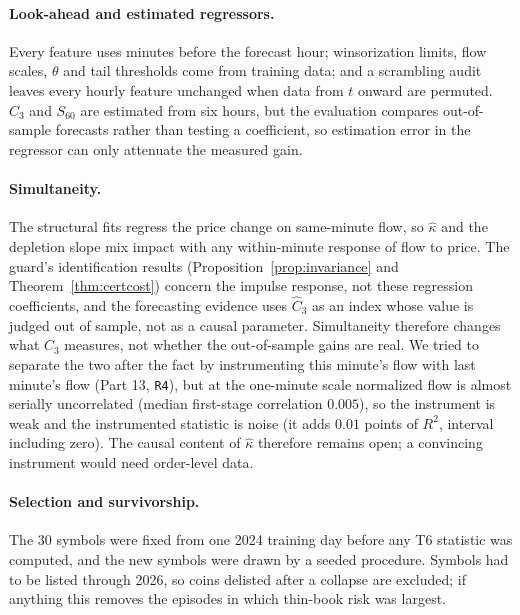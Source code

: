 \paragraph{Look-ahead and estimated regressors.} Every feature uses minutes before the forecast hour; winsorization limits, flow scales, $\theta$ and tail thresholds come from training data; and a scrambling audit leaves every hourly feature unchanged when data from $t$ onward are permuted. $\hat C_3$ and $S_{60}$ are estimated from six hours, but the evaluation compares out-of-sample forecasts rather than testing a coefficient, so estimation error in the regressor can only attenuate the measured gain.

\paragraph{Simultaneity.} The structural fits regress the price change on same-minute flow, so $\hat\kappa$ and the depletion slope mix impact with any within-minute response of flow to price. The guard's identification results (Proposition~\ref{prop:invariance} and Theorem~\ref{thm:certcost}) concern the impulse response, not these regression coefficients, and the forecasting evidence uses $\hat C_3$ as an index whose value is judged out of sample, not as a causal parameter. Simultaneity therefore changes what $\hat C_3$ measures, not whether the out-of-sample gains are real. We tried to separate the two after the fact by instrumenting this minute's flow with last minute's flow (Part 13, \texttt{R4}), but at the one-minute scale normalized flow is almost serially uncorrelated (median first-stage correlation $0.005$), so the instrument is weak and the instrumented statistic is noise (it adds $0.01$ points of $R^2$, interval including zero). The causal content of $\hat\kappa$ therefore remains open; a convincing instrument would need order-level data.

\paragraph{Selection and survivorship.} The 30 symbols were fixed from one 2024 training day before any T6 statistic was computed, and the new symbols were drawn by a seeded procedure. Symbols had to be listed through 2026, so coins delisted after a collapse are excluded; if anything this removes the episodes in which thin-book risk was largest.

